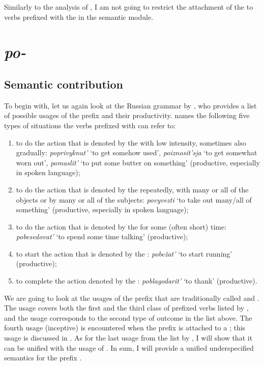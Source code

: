 Similarly to the analysis of , I am not going to restrict the attachment of the  to verbs prefixed with the   in the semantic module.

\section{\textit{po-}}\label{subsection:semantics:po}
\subsection{Semantic contribution} To begin with, let us again look at the Russian grammar by \citet{Shvedova:82}, who provides a list of possible usages of the prefix  and their productivity. \citet[364--365]{Shvedova:82} names the following five types of situations the verbs prefixed with  can refer to:
\begin{enumerate}
\item to do the action that is denoted by the  with low intensity, sometimes also gradually: \textit{poprivyknut'} `to get somehow used', \textit{po\-izno\-sit'sja} `to get somewhat worn out', \textit{pomaslit'} `to put some butter on something'  (productive, especially in spoken language);
\item to do the action that is denoted by the  repeatedly, with many or all of the objects or by many or all of the subjects: \textit{povyvezti} `to take out many/all of something' (productive, especially in spoken language);
\item to do the action that is denoted by the  for some (often short) time: \textit{pobesedovat'} `to spend some time talking' (productive);
\item to start the action that is denoted by the : \textit{pobe\v{z}at'} `to start running' (productive);
\item to complete the action denoted by the : \textit{poblagodarit'} `to thank' (productive).
\end{enumerate}

We are going to look at the usages of the prefix  that are traditionally called  and . The  usage covers both the first and the third class of prefixed verbs listed by \citet{Shvedova:82}, and the  usage corresponds to the second type of outcome in the list above. The fourth usage (inceptive) is encountered when the prefix  is attached to a ; this usage is discussed in \citealt{ZinovaOsswald:paper}. As for the last usage from the list by \citet{Shvedova:82}, I will show that it can be unified with the  usage of . In sum, I will provide a unified underspecified semantics for the prefix .

